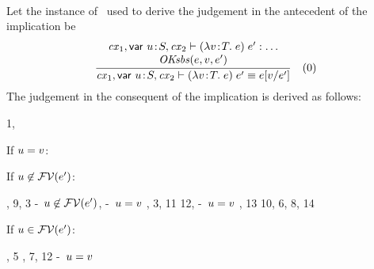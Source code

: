 \begin{bycase}
\Case{\Rthabs}\\
Let the instance of \Rthabs\ used to derive the judgement in the antecedent of
the implication be
\[
\rruleII
 {\hastyany{\cxv}{\app{(\absO)}{\expr'}}}
 {\esbsok{\expr}{\var}{\expr'}}
 {\theo{\cxv}{\eq{\app{(\absO)}{\expr'}}{\esbs{\expr}{\var}{\expr'}}}}
 {0}
\]
The judgement in the consequent of the implication is derived as follows:
\begin{derivation}
     {1, }
\end{derivation}
If $u=v$:
\begin{derivatioN}{5}
\end{derivatioN}
If $u\not\in\mathcal{FV}(e')$:
\begin{derivatioN}{7}
     {\Rthabs, 9, 3}
     {\hyp\ $u\not\in\mathcal{FV}(e')$, \hyp\ $u=v$}
     {, 3, 11}
     {12, \hyp\ $u=v$}
     {, 13}
     {10, 6, 8, 14}
\end{derivatioN}
If $u\in\mathcal{FV}(e')$:
\begin{derivatioN}{7}
     {, 5}
     {\Rthabs, 7, 12}
     {\hyp\ $u=v$}
\end{derivatioN}
\end{bycase}
